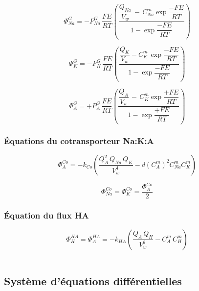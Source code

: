 \documentclass[a4paper,fleqn]{article}
\begin{document}
\begin{equation}
\Phi_{Na}^{G}=-P_{Na}^{G}\,\frac{FE}{RT}\left(\frac{\dfrac{Q_{Na}}{V_w}\,-\,{C_{Na}^{m}\exp{\dfrac{-FE}{RT}}}}{1 - \exp{\dfrac{-FE}{RT}}}\right)
\end{equation}

\begin{equation}
\Phi_{K}^{G}=-P_{K}^{G}\,\frac{FE}{RT}\left(\dfrac{\dfrac{Q_{K}}{V_w}-{C_{K}^{m}\,\exp{\dfrac{-FE}{RT}}}}{1 - \exp{\dfrac{-FE}{RT}}}\right)
\end{equation}

\begin{equation}
\Phi_{A}^{G}=+P_{A}^{G}\,\frac{FE}{RT}\left(\dfrac{\dfrac{Q_{A}}{V_w}\,-\,{C_{K}^{m}\exp{\dfrac{+FE}{RT}}}}{1 - \exp{\dfrac{+FE}{RT}}}\right)
\end{equation}

\subsubsection*{Équations du cotransporteur Na:K:A}

\begin{equation}
\Phi_{A}^{Co}=-k_{Co}\left(\frac{Q_{A}^2\,Q_{Na}\,Q_{K}}{V_w^4}-d\left(C_{A}^{m}\right)^2C_{Na}^{m}C_{K}^{m}\right)
\end{equation}

\begin{equation}
\Phi_{Na}^{Co}=\Phi_{K}^{Co}=\frac{\Phi_{A}^{Co}}{2}
\end{equation}

\subsubsection*{Équation du flux HA}

\begin{equation}
\Phi_{H}^{HA}=\Phi_{A}^{HA}=-k_{HA}( \frac{Q_A\,Q_H}{V_w^2} - C_{A}^{m}\,C_{H}^{m})
\end{equation}\\

\subsection{Système d'équations différentielles}
\end{document}
